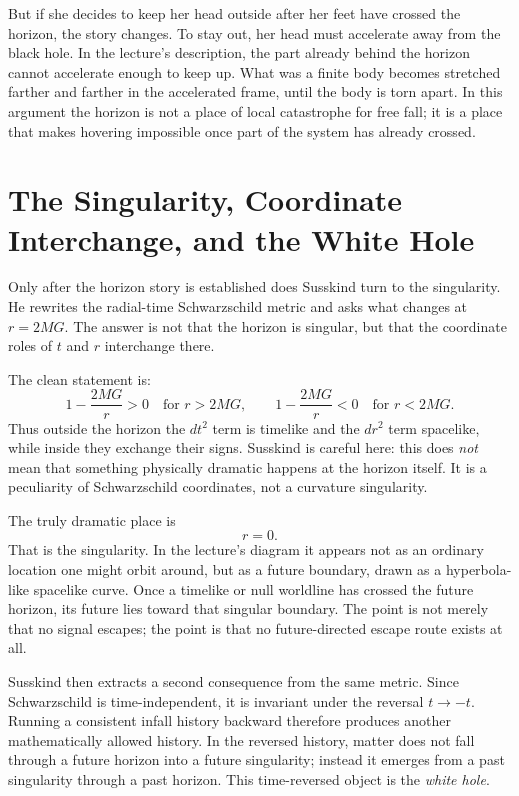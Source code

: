 But if she decides to keep her head outside after her feet have crossed the horizon, the story changes. To stay out, her head must accelerate away from the black hole. In the lecture's description, the part already behind the horizon cannot accelerate enough to keep up. What was a finite body becomes stretched farther and farther in the accelerated frame, until the body is torn apart. In this argument the horizon is not a place of local catastrophe for free fall; it is a place that makes hovering impossible once part of the system has already crossed.

\section{The Singularity, Coordinate Interchange, and the White Hole}

Only after the horizon story is established does Susskind turn to the singularity. He rewrites the radial-time Schwarzschild metric and asks what changes at \(r=2MG\). The answer is not that the horizon is singular, but that the coordinate roles of \(t\) and \(r\) interchange there.

The clean statement is:
\begin{equation}
1-\frac{2MG}{r}>0 \quad \text{for } r>2MG,
\qquad
1-\frac{2MG}{r}<0 \quad \text{for } r<2MG.
\end{equation}
Thus outside the horizon the \(dt^2\) term is timelike and the \(dr^2\) term spacelike, while inside they exchange their signs. Susskind is careful here: this does \emph{not} mean that something physically dramatic happens at the horizon itself. It is a peculiarity of Schwarzschild coordinates, not a curvature singularity.

The truly dramatic place is
\begin{equation}
r=0.
\end{equation}
That is the singularity. In the lecture's diagram it appears not as an ordinary location one might orbit around, but as a future boundary, drawn as a hyperbola-like spacelike curve. Once a timelike or null worldline has crossed the future horizon, its future lies toward that singular boundary. The point is not merely that no signal escapes; the point is that no future-directed escape route exists at all.

Susskind then extracts a second consequence from the same metric. Since Schwarzschild is time-independent, it is invariant under the reversal \(t\to -t\). Running a consistent infall history backward therefore produces another mathematically allowed history. In the reversed history, matter does not fall through a future horizon into a future singularity; instead it emerges from a past singularity through a past horizon. This time-reversed object is the \emph{white hole}.

